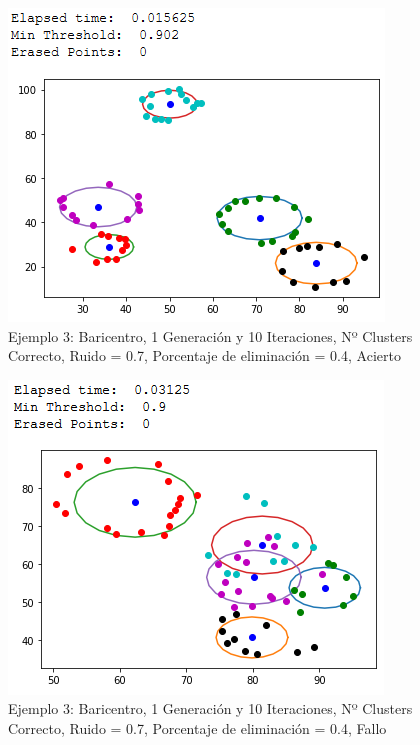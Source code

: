 \documentclass[conference,a4paper]{IEEEtran}
\begin{document}
\begin{figure}[H]
\centering
\includegraphics[scale=0.65]{Experimentacion/Ejemplo3/ej3_b_1_10_re_correct}
\caption{Ejemplo 3: Baricentro, 1 Generación y 10 Iteraciones,  Nº Clusters Correcto, Ruido = 0.7, Porcentaje de eliminación = 0.4, Acierto\\}
\end{figure}

\begin{figure}[H]
\centering
\includegraphics[scale=0.65]{Experimentacion/Ejemplo2/ej2_b_1_10_re_wrong}
\caption{Ejemplo 3: Baricentro, 1 Generación y 10 Iteraciones,  Nº Clusters Correcto, Ruido = 0.7, Porcentaje de eliminación = 0.4, Fallo\\}
\end{figure}
\end{document}
